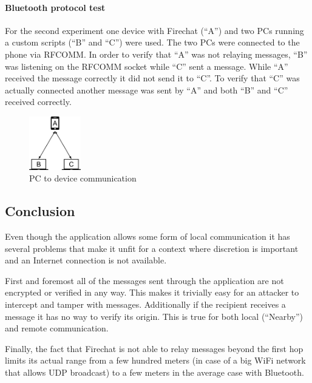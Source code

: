 \paragraph{Bluetooth protocol test}
For the second experiment one device with Firechat (``A'') and two PCs running a custom scripts \cite{custom-script} (``B'' and ``C'') were used. The two PCs were connected to the phone via RFCOMM. In order to verify that ``A'' was not relaying messages, ``B'' was listening on the RFCOMM socket while ``C'' sent a message. While ``A'' received the message correctly it did not send it to ``C''. To verify that ``C'' was actually connected another message was sent by ``A'' and both ``B'' and ``C'' received correctly.

\begin{figure}[ht!]
  \centering
  \includegraphics[width=0.2\textwidth]{img/diagram2.png} 
  \caption{PC to device communication}
\end{figure}

\subsection{Conclusion}
Even though the application allows some form of local communication it has several problems that make it unfit for a context where discretion is important \cite{iraq-internet-filter} and an Internet connection is not available.

First and foremost all of the messages sent through the application are not encrypted or verified in any way. This makes it trivially easy for an attacker to intercept and tamper with messages.
Additionally if the recipient receives a message it has no way to verify its origin. This is true for both local (``Nearby'') and remote communication.

Finally, the fact that Firechat is not able to relay messages beyond the first hop limits its actual range from a few hundred meters (in case of a big WiFi network that allows UDP broadcast) to a few meters in the average case with Bluetooth.